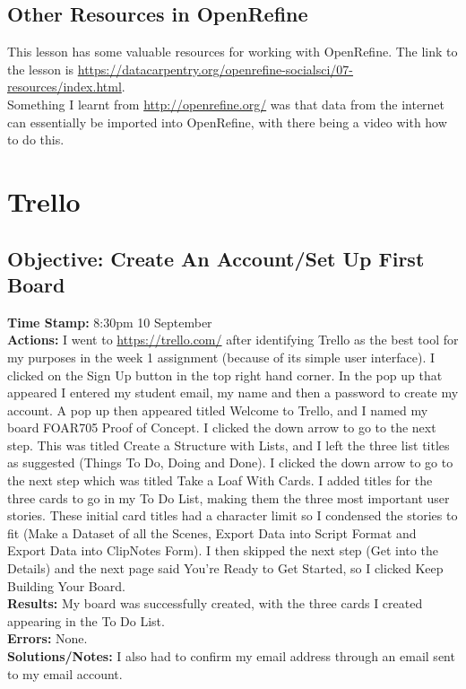 \documentclass{article}
\begin{document}
\begin{FlushLeft}
\subsection{Other Resources in OpenRefine}
This lesson has some valuable resources for working with OpenRefine. The link to the lesson is \url{https://datacarpentry.org/openrefine-socialsci/07-resources/index.html}.\\
Something I learnt from \url{http://openrefine.org/} was that data from the internet can essentially be imported into OpenRefine, with there being a video with how to do this.
\vspace{5mm}

\pagebreak

\section{Trello}
\subsection{Objective: Create An Account/Set Up First Board}
\textbf{Time Stamp:} 8:30pm 10 September\\
\textbf{Actions:} I went to \url{https://trello.com/} after identifying Trello as the best tool for my purposes in the week 1 assignment (because of its simple user interface). I clicked on the Sign Up button in the top right hand corner. In the pop up that appeared I entered my student email, my name and then a password to create my account. A pop up then appeared titled Welcome to Trello, and I named my board FOAR705 Proof of Concept. I clicked the down arrow to go to the next step. This was titled Create a Structure with Lists, and I left the three list titles as suggested (Things To Do, Doing and Done). I clicked the down arrow to go to the next step which was titled Take a Loaf With Cards. I added titles for the three cards to go in my To Do List, making them the three most important user stories. These initial card titles had a character limit so I condensed the stories to fit (Make a Dataset of all the Scenes, Export Data into Script Format and Export Data into ClipNotes Form). I then skipped the next step (Get into the Details) and the next page said You're Ready to Get Started, so I clicked Keep Building Your Board.\\
\textbf{Results:} My board was successfully created, with the three cards I created appearing in the To Do List. \\
\textbf{Errors:} None.\\
\textbf{Solutions/Notes:} I also had to confirm my email address through an email sent to my email account.\\


\end{FlushLeft}
\end{document}
